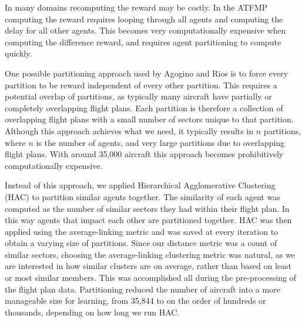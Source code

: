 \documentclass{aamas2014}
\begin{document}
In many domains recomputing the reward may be costly. In the ATFMP computing the reward requires looping through all agents and computing the delay for all other agents. This becomes very computationally expensive when computing the difference reward, and requires agent partitioning to compute quickly.


One possible partitioning approach used by Agogino and Rios \cite{6095996} is to force every partition to be reward independent of every other partition. This requires a potential overlap of partitions, as typically many aircraft have partially or completely overlapping flight plans. Each partition is therefore a collection of overlapping flight plans with a small number of sectors unique to that partition. Although this approach achieves what we need, it typically results in $n$ partitions, where $n$ is the number of agents, and very large partitions due to overlapping flight plans. With around 35,000 aircraft this approach becomes prohibitively computationally expensive.

Instead of this approach, we applied Hierarchical Agglomerative Clustering (HAC) \cite{Agglomerative} to partition similar agents together. The similarity of each agent was computed as the number of similar sectors they had within their flight plan. In this way agents that impact each other are partitioned together. HAC was then applied using the average-linking metric and was saved at every iteration to obtain a varying size of partitions. Since our distance metric was a count of similar sectors, choosing the average-linking clustering metric was natural, as we are interested in how similar clusters are on average, rather than based on least or most similar members. This was accomplished all during the pre-processing of the flight plan data. Partitioning reduced the number of aircraft into a more manageable size for learning, from 35,844 to on the order of hundreds or thousands, depending on how long we run HAC.
\end{document}
